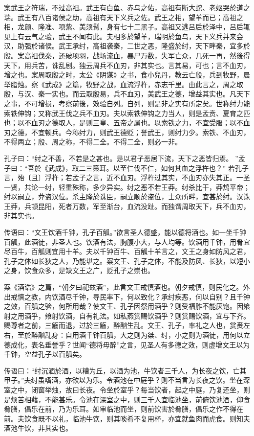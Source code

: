 \documentclass[]{article}
\begin{document}
案武王之符瑞，不过高祖。武王有白鱼、赤乌之佑，高祖有断大蛇、老妪哭於道之瑞。武王有八百诸侯之助，高祖有天下义兵之佐。武王之相，望羊而已；高祖之相，龙颜、隆准、项紫、美须髯，身有七十二黑子。高祖又逃吕后於泽中，吕后辄见上有云气之验，武王不闻有此。夫相多於望羊，瑞明於鱼乌，天下义兵并来会汉，助强於诸侯。武王承纣，高祖袭秦，二世之恶，隆盛於纣，天下畔秦，宜多於殷。案高祖伐秦，还破项羽，战场流血，暴尸万数，失军亡众，几死一再，然後得天下，用兵苦，诛乱剧。独云周兵不血刃，非其实也。言其易，可也；言不血刃，增之也。案周取殷之时，太公《阴谋》之书，食小兒丹，教云亡殷，兵到牧野，晨举脂烛。察《武成》之篇，牧野之战，血流浮杵，赤志千里。由此言之，周之取殷，与汉、秦一实也。而云取殷易，兵不血刃，美武王之德，增益其实也。凡天下之事，不可增损，考察前後，效验自列。自列，则是非之实有所定矣。世称纣力能索铁伸钩；又称武王伐之兵不血刃。夫以索铁伸钩之力当人，则是孟贲、夏育之匹也；以不血刃之德取人，是则三皇、五帝之属也。以索铁之力，不宜受服；以不血刃之德，不宜顿兵。今称纣力，则武王德贬；誉武王，则纣力少。索铁、不血刃，不得两立；殷、周之称，不得二全。不得二全，则必一非。

孔子曰：``纣之不善，不若是之甚也。是以君子恶居下流，天下之恶皆归焉。
''孟子曰：``吾於《武成》，取二三策耳。以至仁伐不仁，如何其血之浮杵也？''
若孔子言，殆〔且〕浮杵；若孟子之言，近不血刃。浮杵过其实，不血刃亦失其正。一圣一贤，共论一纣，轻重殊称，多少异实。纣之恶不若王莽。纣杀比干，莽鸩平帝；纣以嗣立，莽盗汉位。杀主隆於诛臣，嗣立顺於盗位，士众所畔，宜甚於纣。汉诛王莽，兵顿昆阳，死者万数，军至渐台，血流没趾。而独谓周取天下，兵不血刃，非其实也。

传语曰：``文王饮酒千钟，孔子百觚。''欲言圣人德盛，能以德将酒也。如一坐千钟百觚，此酒徒，非圣人也。饮酒有法，胸腹小大，与人均等。饮酒用千钟，用肴宜尽百牛，百觚则宜用十羊。夫以千钟百牛、百觚十羊言之，文王之身如防风之君，孔子之体如长狄之人，乃能堪之。案文王、孔子之体，不能及防风、长狄，以短小之身，饮食众多，是缺文王之广，贬孔子之崇也。

案《酒诰》之篇，``朝夕曰祀兹酒''，此言文王戒慎酒也。朝夕戒慎，则民化之。外出戒慎之教，内饮酒尽千钟，导民率下，何以致化？承纣疾恶，何以自别？且千钟之效，百觚之验，何所用哉？使文王、孔子因祭用酒乎？则受福胙不能厌饱。因飨射之用酒乎，飨射饮酒，自有礼法。如私燕赏赐饮酒乎？则赏赐饮酒，宜与下齐。赐尊者之前，三觞而退，过於三觞，醉酗生乱。文王、孔子，率礼之人也，赏赉左右，至於醉酗乱身：自用酒千钟百觚，大之则为桀、纣，小之则为酒徒，用何以立德成化，表名垂誉乎？世闻``德将毋醉''之言，见圣人有多德之效，则虚增文王以为千钟，空益孔子以百觚矣。

传语曰：``纣沉湎於酒，以糟为丘，以酒为池，牛饮者三千人，为长夜之饮，亡其甲子。''夫纣虽嗜酒，亦欲以为乐。令酒池在中庭乎？则不当言为长夜之饮。坐在深室之中，闭窗举烛，故曰长夜。令坐於室乎？每当饮者，起之中庭，乃复还坐，则是烦苦相藉，不能甚乐。令池在深室之中，则三千人宜临池坐，前俯饮池酒，仰食肴膳，倡乐在前，乃为乐耳。如审临池而坐，则前饮害於肴膳，倡乐之作不得在前。夫饮食既不以礼，临池牛饮，则其啖肴不复用杯，亦宜就鱼肉而虎食。则知夫酒池牛饮，非其实也。
\end{document}
